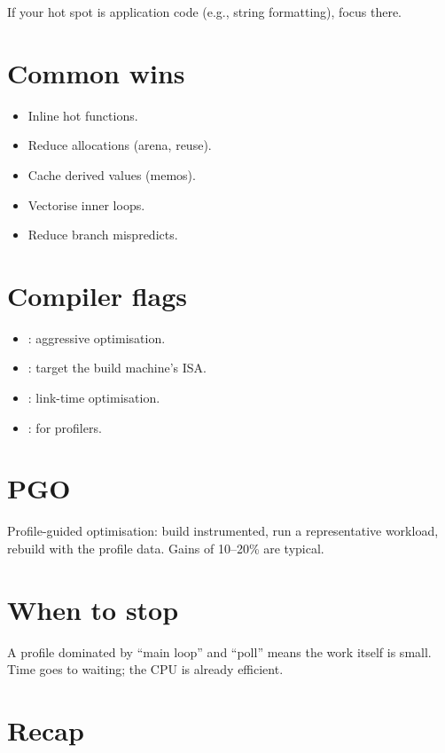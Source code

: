 If your hot spot is application code (e.g., string
formatting), focus there.

\section{Common wins}

\begin{itemize}[leftmargin=*]
  \item Inline hot functions.
  \item Reduce allocations (arena, reuse).
  \item Cache derived values (memos).
  \item Vectorise inner loops.
  \item Reduce branch mispredicts.
\end{itemize}

\section{Compiler flags}

\begin{itemize}[leftmargin=*]
  \item {}: aggressive optimisation.
  \item {}: target the build machine's
    ISA.
  \item {}: link-time optimisation.
  \item {}: for profilers.
\end{itemize}

\section{PGO}

Profile-guided optimisation: build instrumented, run a
representative workload, rebuild with the profile data.
Gains of 10--20\% are typical.

\section{When to stop}

A profile dominated by ``main loop'' and ``poll'' means the
work itself is small. Time goes to waiting; the CPU is
already efficient.

\section{Recap}

